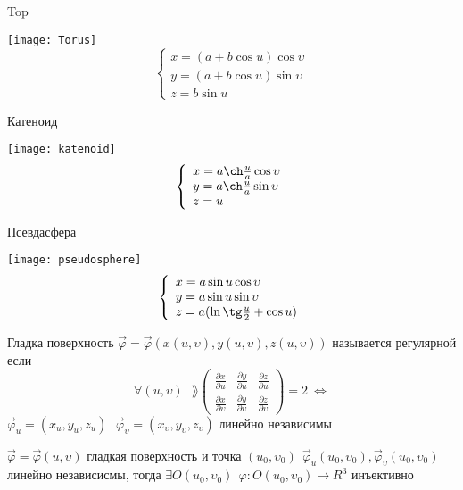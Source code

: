\begin{block}[Примеры]
  \begin{center}
    Top
  \end{center}
  \texttt{[image: Torus]}
  $$
  \left\{
  \begin{array}{l}
    x = (a + b\cos u) \cos \upsilon \\
    y = (a + b\cos u) \sin \upsilon \\
    z = b \sin u
  \end{array}
  \right.
  $$
  \begin{center}
    Катеноид
  \end{center}
  \texttt{[image: katenoid]}
  $$
  \left\{
  \begin{array}{l}
    x = a \ch \frac{u}{a} \cos \upsilon \\
    y = a \ch \frac{u}{a} \sin \upsilon \\
    z = u
  \end{array}
  \right.
  $$
  \begin{center}
    Псевдасфера
  \end{center}
  \texttt{[image: pseudosphere]}
  $$
  \left\{
  \begin{array}{l}
    x = a \sin u \cos \upsilon \\
    y = a \sin u \sin \upsilon \\
    z = a( \ln \tg \frac{u}{2} + \cos u)
  \end{array}
  \right.
  $$
\end{block}

\begin{define}
  Гладка поверхность $\vec \varphi = \vec \varphi
  (x(u, \upsilon), y(u, \upsilon), z(u, \upsilon))$ называется регулярной если
  $$
  \forall (u, \upsilon) ~~~
  \rang \left(
  \begin{array}{ccc}
    \frac{\partial x}{\partial u} & \frac{\partial y}{\partial u} &
    \frac{\partial z}{\partial u} \\
    \frac{\partial x}{\partial \upsilon} &
    \frac{\partial y}{\partial \upsilon} &
    \frac{\partial z}{\partial \upsilon}
  \end{array}
  \right) = 2 ~ \Leftrightarrow
  $$
  $\vec \varphi_u = (x_u, y_u, z_u) ~~~ \vec \varphi_{\upsilon} =
  (x_{\upsilon}, y_{\upsilon}, z_{\upsilon})$ линейно независимы
\end{define}

\begin{theorem}
  $\vec \varphi = \vec \varphi(u, \upsilon)$ гладкая поверхность и точка
  $(u_0, \upsilon_0) ~~ \vec \varphi_u (u_0, \upsilon_0),
  \vec \varphi_{\upsilon} (u_0, \upsilon_0)$ линейно независисмы, тогда
  $\exists O(u_0, \upsilon_0) ~~ \varphi : O(u_0, \upsilon_0) \to R^3$
  инъективно
\end{theorem}

